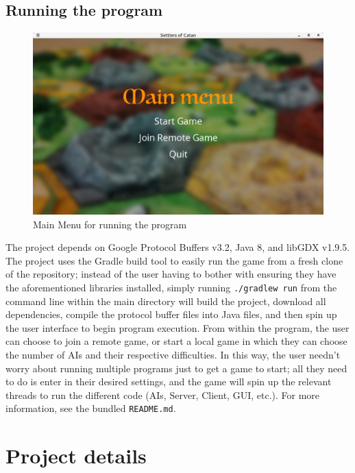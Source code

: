 \documentclass[a4paper,doc]{apa6}
\newcommand{\code}{\texttt}
\begin{document}
\subsection{Running the program}
\begin{figure}[hbtp]
      \includegraphics[width=\textwidth]{images/MainMenu}
      \caption{Main Menu for running the program}
\end{figure}
The project depends on Google Protocol Buffers v3.2, Java 8, and libGDX v1.9.5. The project uses the Gradle build tool to easily run the game from a fresh clone of the repository; instead of the user having to bother with ensuring they have the aforementioned libraries installed, simply running \code{./gradlew run} from the command line within the main directory will build the project, download all dependencies, compile the protocol buffer files into Java files, and then spin up the user interface to begin program execution. From within the program, the user can choose to join a remote game, or start a local game in which they can choose the number of AIs and their respective difficulties. In this way, the user needn't worry about running multiple programs just to get a game to start; all they need to do is enter in their desired settings, and the game will spin up the relevant threads to run the different code (AIs, Server, Client, GUI, etc.). For more information, see the bundled \code{README.md}.



\section{Project details}
\end{document}
